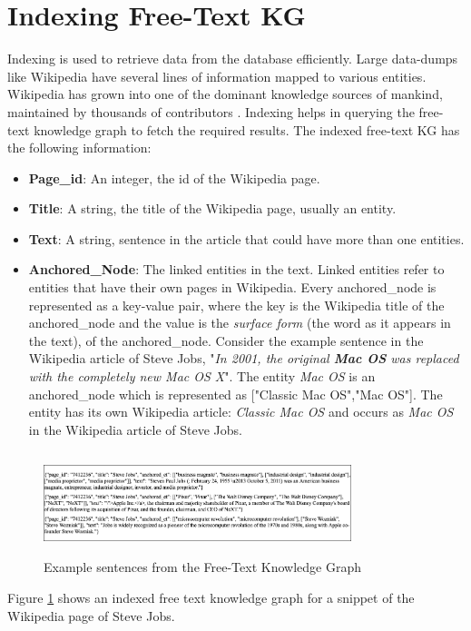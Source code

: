 \begin{sloppypar}
\section{Indexing Free-Text KG}
Indexing is used to retrieve data from the database efficiently. Large data-dumps like Wikipedia have several lines of information mapped to various entities. Wikipedia has grown into one of the dominant knowledge sources of mankind, maintained by thousands of contributors \cite{dbpedia}. Indexing helps in querying the free-text knowledge graph to fetch the required results.
The indexed free-text KG has the following information:
\begin{itemize}
    \item \textbf{Page\_id}: An integer, the id of the Wikipedia page.
    \item \textbf{Title}: A string, the title of the Wikipedia page, usually an entity.
    \item \textbf{Text}: A string, sentence in the article that could have more than one entities.
    \item \textbf{Anchored\_Node}: The linked entities in the text. Linked entities refer to entities that have their own pages in Wikipedia. Every anchored\_node is represented as a key-value pair, where the key is the Wikipedia title of the anchored\_node and the value is the \textit{surface form} (the word as it appears in the text), of the anchored\_node. Consider the example sentence in the Wikipedia article of Steve Jobs, "\textit{In 2001, the original \textbf{Mac OS} was replaced with the completely new Mac OS X}". The entity \textit{Mac OS} is an anchored\_node which is represented as ["Classic Mac OS","Mac OS"]. The entity has its own Wikipedia article: \textit{Classic Mac OS} and occurs as \textit{Mac OS} in the Wikipedia article of Steve Jobs.
\end{itemize}
\begin{figure}
    \centering
    \includegraphics[width=0.8\textwidth,height=3cm]{chapters/figures/SJ2.jpg}
      \caption{Example sentences from the Free-Text Knowledge Graph}
    \label{fig:ftkgsent}
\end{figure}
Figure \ref{fig:ftkgsent} shows an indexed free text knowledge graph for a snippet of the Wikipedia page of Steve Jobs.


\end{sloppypar}
